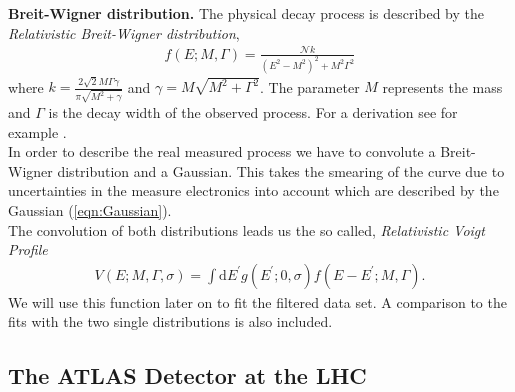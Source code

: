 \documentclass[twocolumn,
			   showpacs,%
               nofootinbib,
               aps,%
               prd,
               notitlepage,
               showkeys,
               10pt]{revtex4-1}
\begin{document}
\textbf{Breit-Wigner distribution.} The physical decay process is described by the \textit{Relativistic Breit-Wigner distribution}, 
\begin{align}
	f(E ; M, \Gamma)=\frac{\mathcal{N} k}{\left(E^{2}-M^{2}\right)^{2}+M^{2} \Gamma^{2}}
\end{align}
where $k=\frac{2 \sqrt{2} M \Gamma \gamma}{\pi \sqrt{M^{2}+\gamma}}$ and $\gamma=M \sqrt{M^{2}+\Gamma^{2}}$. The parameter $M$ represents the mass and $\Gamma$ is the decay width of the observed process. For a derivation see for example \cite{BohmSato2004}. \\

In order to describe the real measured process we have to convolute a Breit-Wigner distribution and a Gaussian. This takes the smearing of the curve due to uncertainties in the measure electronics into account which are described by the Gaussian (\ref{eqn:Gaussian}). \\

The convolution of both distributions leads us the so called, \textit{Relativistic Voigt Profile}
\begin{align}
	V(E ; M, \Gamma, \sigma)=\int \mathrm{d} E^{\prime} g\left(E^{\prime} ; 0, \sigma\right) f\left(E-E^{\prime} ; M, \Gamma\right).
\end{align}
We will use this function later on to fit the filtered data set. A comparison to the fits with the two single distributions is also included. 
\subsection{The ATLAS Detector at the LHC}
\end{document}
